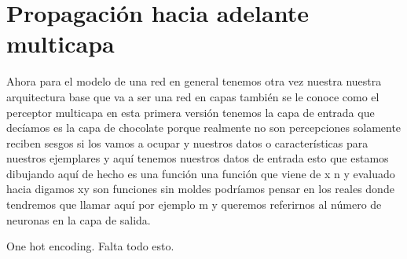 \section{Propagación hacia adelante multicapa}


Ahora para el modelo de una red en general tenemos otra vez nuestra nuestra arquitectura base que va a ser una red en capas también se le conoce como el perceptor multicapa en esta primera versión tenemos la capa de entrada que decíamos es la capa de chocolate porque realmente no son percepciones solamente reciben sesgos si los vamos a ocupar y nuestros datos o características para nuestros ejemplares y aquí tenemos nuestros datos de entrada esto que estamos dibujando aquí de hecho es una función una función que viene de x n y evaluado hacia digamos xy son funciones sin moldes podríamos pensar en los reales donde tendremos que llamar aquí por ejemplo m y queremos referirnos al número de neuronas en la capa de salida. 

One hot encoding.
Falta todo esto.
